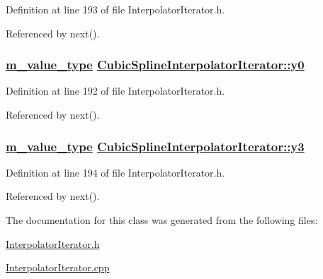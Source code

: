 Definition at line 193 of file Interpolator\-Iterator.h.

Referenced by next().\hypertarget{classCubicSplineInterpolatorIterator_r1}{
\subsubsection[y0]{\setlength{\rightskip}{0pt plus 5cm}\hyperlink{Types_8h_a3}{m\_\-value\_\-type} \hyperlink{classCubicSplineInterpolatorIterator_r1}{Cubic\-Spline\-Interpolator\-Iterator::y0}}}
\label{classCubicSplineInterpolatorIterator_r1}




Definition at line 192 of file Interpolator\-Iterator.h.

Referenced by next().\hypertarget{classCubicSplineInterpolatorIterator_r3}{
\subsubsection[y3]{\setlength{\rightskip}{0pt plus 5cm}\hyperlink{Types_8h_a3}{m\_\-value\_\-type} \hyperlink{classCubicSplineInterpolatorIterator_r3}{Cubic\-Spline\-Interpolator\-Iterator::y3}}}
\label{classCubicSplineInterpolatorIterator_r3}




Definition at line 194 of file Interpolator\-Iterator.h.

Referenced by next().

The documentation for this class was generated from the following files:\begin{CompactItemize}
\item 
\hyperlink{InterpolatorIterator_8h}{Interpolator\-Iterator.h}\item 
\hyperlink{InterpolatorIterator_8cpp}{Interpolator\-Iterator.cpp}\end{CompactItemize}
